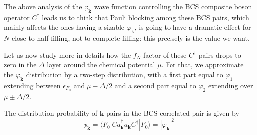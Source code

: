 \documentclass[aps,prb,preprint,groupedaddress,amsmath]{revtex4-1}
\newcommand{\vk}{\ensuremath{\mathbf{k}}}
\newcommand{\dg}{\ensuremath{\dagger}}
\begin{document}
The above analysis of the $\varphi_\vk$ wave function controlling the BCS composite boson operator $C^\dg$ leads us to think that Pauli blocking among these BCS pairs, which mainly affects the ones having a sizable $\varphi_\vk$, is going to have a dramatic effect for $N$ close to half filling, not to complete filling: this precisely is the value we want. 

Let us now study more in details how the $f_N$ factor of these $C^\dg$ pairs drops to zero in the $\Delta$ layer around the chemical potential $\mu$.  For that, we approximate the $\varphi_\vk$ distribution by a two-step distribution, with a first part equal to $\varphi_1$ extending between $\epsilon_{F_0}$ and $\mu-\Delta/2$ and a second part equal to $\varphi_2$ extending over $\mu\pm\Delta/2$. 


  The distribution probability of $\vk$ pairs in the BCS correlated pair is  given by 
\begin{equation}
p_\vk=\langle{}F_0|Ca^\dg_\vk{}a_\vk{}C^\dg|F_0\rangle=|\varphi_\vk|^2
\end{equation}

%
\end{document}
